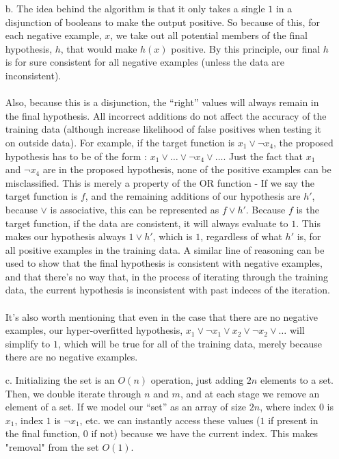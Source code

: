 \begin{enumerate}
\begin{enumerate}
		\item[b.]
			The idea behind the algorithm is that it only takes a single $1$ in a disjunction of booleans to make the output positive. So because of this, for each negative example, $x$, we take out all potential members of the final hypothesis, $h$, that would make $h(x)$ positive. By this principle, our final $h$ is for sure consistent for all negative examples (unless the data are inconsistent).\\\\ 
			Also, because this is a disjunction, the ``right'' values will always remain in the final hypothesis. All incorrect additions do not affect the accuracy of the training data (although increase likelihood of false positives when testing it on outside data). For example, if the target function is $x_1 \vee \neg x_4$, the proposed hypothesis has to be of the form : $x_1 \vee \ldots \vee \neg x_4 \vee \ldots$. Just the fact that $x_1$ and $\neg x_4$ are in the proposed hypothesis, none of the positive examples can be misclassified. This is merely a property of the OR function - If we say the target function is $f$, and the remaining additions of our hypothesis are $h'$, because $\vee$ is associative, this can be represented as $f \vee h'$. Because $f$ is the target function, if the data are consistent, it will always evaluate to $1$. This makes our hypothesis always $1 \vee h'$, which is $1$, regardless of what $h'$ is, for all positive examples in the training data. A similar line of reasoning can be used to show that the final hypothesis is consistent with negative examples, and that there's no way that, in the process of iterating through the training data, the current hypothesis is inconsistent with past indeces of the iteration.\\\\
		It's also worth mentioning that even in the case that there are no negative examples, our hyper-overfitted hypothesis, $x_1 \vee \neg x_1 \vee x_2 \vee \neg x_2 \vee \ldots$ will simplify to $1$, which will be true for all of the training data, merely because there are no negative examples. 
		\item[c.]
			Initializing the set is an $O(n)$ operation, just adding $2n$ elements to a set.\\
			Then, we double iterate through $n$ and $m$, and at each stage we remove an element of a set.
			If we model our ``set'' as an array of size $2n$, where index $0$ is $x_1$, index $1$ is $\neg x_1$, etc. we can instantly access these values ($1$ if present in the final function, $0$ if not) because we have the current index. This makes "removal" from the set $O(1)$.

\end{enumerate}
\end{enumerate}
